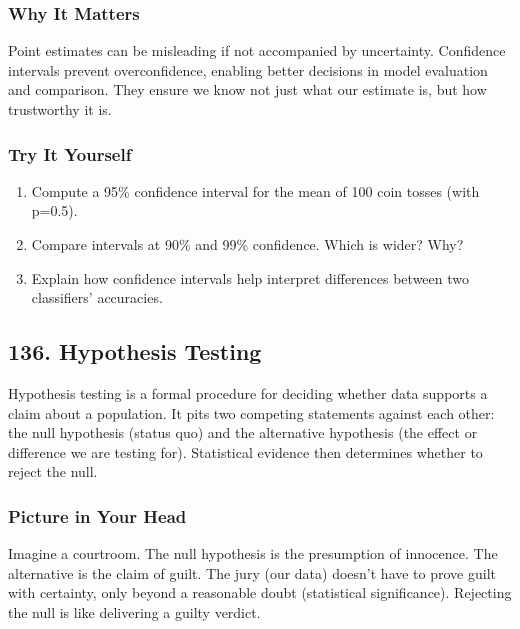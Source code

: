 \documentclass[
  letterpaper,
  DIV=11,
  numbers=noendperiod]{scrreprt}
\providecommand{\tightlist}{%
  \setlength{\itemsep}{0pt}\setlength{\parskip}{0pt}}
\begin{document}
\subsubsection{Why It Matters}\label{why-it-matters-32}

Point estimates can be misleading if not accompanied by uncertainty.
Confidence intervals prevent overconfidence, enabling better decisions
in model evaluation and comparison. They ensure we know not just what
our estimate is, but how trustworthy it is.

\subsubsection{Try It Yourself}\label{try-it-yourself-134}

\begin{enumerate}
\def\labelenumi{\arabic{enumi}.}
\tightlist
\item
  Compute a 95\% confidence interval for the mean of 100 coin tosses
  (with p=0.5).
\item
  Compare intervals at 90\% and 99\% confidence. Which is wider? Why?
\item
  Explain how confidence intervals help interpret differences between
  two classifiers' accuracies.
\end{enumerate}

\subsection{136. Hypothesis Testing}\label{hypothesis-testing}

Hypothesis testing is a formal procedure for deciding whether data
supports a claim about a population. It pits two competing statements
against each other: the null hypothesis (status quo) and the alternative
hypothesis (the effect or difference we are testing for). Statistical
evidence then determines whether to reject the null.

\subsubsection{Picture in Your Head}\label{picture-in-your-head-135}

Imagine a courtroom. The null hypothesis is the presumption of
innocence. The alternative is the claim of guilt. The jury (our data)
doesn't have to prove guilt with certainty, only beyond a reasonable
doubt (statistical significance). Rejecting the null is like delivering
a guilty verdict.
\end{document}
